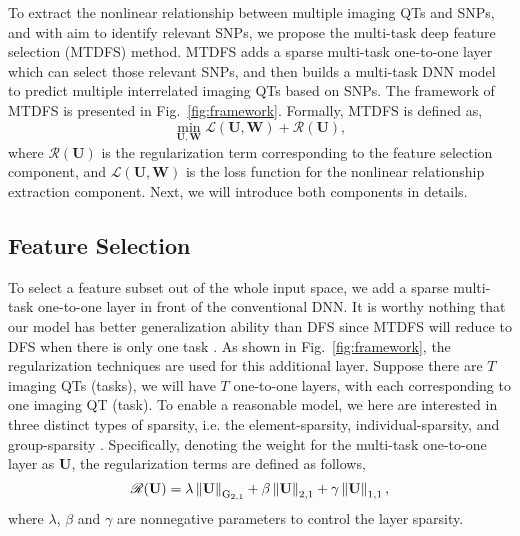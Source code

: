 \documentclass{llncs}
\newcommand{\norm}[1]{\left\lVert#1\right\rVert}
\begin{document}
To extract the nonlinear relationship between multiple imaging QTs and SNPs, and with aim to identify relevant SNPs, we propose the multi-task deep feature selection (MTDFS) method. MTDFS adds a sparse multi-task one-to-one layer which can select those relevant SNPs, and then builds a multi-task DNN model to predict multiple interrelated imaging QTs based on SNPs. The framework of MTDFS is presented in Fig.~\ref{fig:framework}. Formally, MTDFS is defined as,
\begin{equation} \label{eq:mtdfs}
\min_{\mathbf{U},\mathbf{W}} \mathcal{L}(\mathbf{U},\mathbf{W}) + \mathcal{R}(\mathbf{U}),
\end{equation}
where $\mathcal{R}(\mathbf{U})$ is the regularization term corresponding to the feature selection component, and $\mathcal{L}(\mathbf{U},\mathbf{W})$ is the loss function for the nonlinear relationship extraction component. Next, we will introduce both components in details.

\subsection{Feature Selection}

To select a feature subset out of the whole input space, we add a sparse multi-task one-to-one layer in front of the conventional DNN. It is worthy nothing that our model has better generalization ability than DFS since MTDFS will reduce to DFS when there is only one task \cite{li2015}. As shown in Fig.~\ref{fig:framework}, the regularization techniques are used for this additional layer. Suppose there are $T$ imaging QTs (tasks), we will have $T$ one-to-one layers, with each corresponding to one imaging QT (task). To enable a reasonable model, we here are interested in three distinct types of sparsity, i.e. the element-sparsity, individual-sparsity, and group-sparsity \cite{du2020tmi}. Specifically, denoting the weight for the multi-task one-to-one layer as $\mathbf{U}$, the regularization terms are defined as follows,
\begin{equation} \label{eq:penalty}
\mathcal{R}(\mathbf{U}) = \lambda \norm{\mathbf{U}}_{\rm G_{2,1}} + \beta \norm{\mathbf{U}}_{2,1} + \gamma \norm{\mathbf{U}}_{1,1},
\end{equation}
where $\lambda$, $\beta$ and $\gamma$ are nonnegative parameters to control the layer sparsity.
\end{document}
